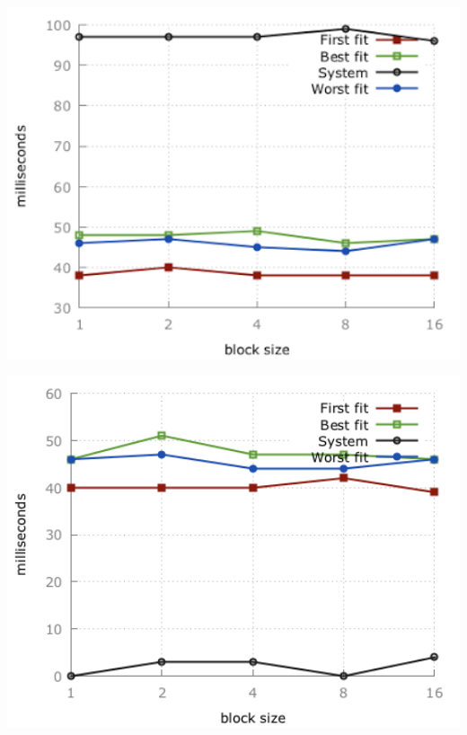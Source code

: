 \documentclass[paper=a4, fontsize=11pt]{scrartcl} %
\numberwithin{equation}{section} %
\numberwithin{figure}{section} %
\numberwithin{table}{section} %
\begin{document}
\begin{minipage}{.5\textwidth}
    \centering
    \includegraphics[width=1\textwidth]{images/time_plot_small1.png}
    \label{fig:small1}
\end{minipage}%
\begin{minipage}{.5\textwidth}
    \centering
    \includegraphics[width=1\textwidth]{images/time_plot_small2.png}
    \label{fig:small2}
\end{minipage}\\\\
\end{document}
